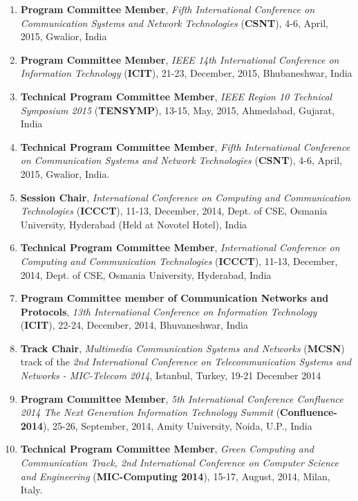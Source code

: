 \begin{enumerate}
\item
\textbf{Program Committee Member},  \textit{Fifth International Conference on Communication Systems and Network Technologies }(\textbf{CSNT}), 4-6, April, 2015, Gwalior, India

\item
\textbf{Program Committee Member}, \textit{IEEE 14th International Conference on Information Technology} (\textbf{ICIT}), 21-23, December, 2015, Bhubaneshwar, India

\item
\textbf{Technical Program Committee Member}, \textit{IEEE Region 10 Technical Symposium 2015} (\textbf{TENSYMP}), 13-15, May, 2015, Ahmedabad, Gujarat, India

\item
\textbf{Technical Program Committee Member}, \textit{Fifth International Conference on Communication Systems and Network Technologies} (\textbf{CSNT}), 4-6, April, 2015, Gwalior, India.

\item
\textbf{Session Chair}, \textit{International Conference on Computing and Communication Technologies} (\textbf{ICCCT}), 11-13, December, 2014, Dept. of CSE, Osmania University, Hyderabad (Held at Novotel Hotel), India

\item
\textbf{Technical Program Committee Member}, \textit{International Conference on Computing and Communication Technologies }(\textbf{ICCCT}), 11-13, December, 2014, Dept. of CSE, Osmania University, Hyderabad, India

\item
\textbf{Program Committee member of Communication Networks and Protocols}, \textit{13th International Conference on Information Technology} (\textbf{ICIT}), 22-24, December, 2014, Bhuvaneshwar, India

\item
\textbf{Track Chair}, \textit{Multimedia Communication Systems and Networks }(\textbf{MCSN}) track of the \textit{2nd International Conference on Telecommunication Systems and Networks - MIC-Telecom 2014}, Istanbul, Turkey, 19-21 December 2014 


\item
\textbf{Program Committee Member}, \textit{5th International Conference Confluence 2014 The Next Generation Information Technology Summit} (\textbf{Confluence-2014}), 25-26, September, 2014, Amity University, Noida, U.P., India

\item
\textbf{Technical Program Committee Member}, \textit{Green Computing and Communication Track, 2nd International Conference on Computer Science and Engineering} (\textbf{MIC-Computing 2014}), 15-17, August, 2014, Milan, Italy.


\end{enumerate}
